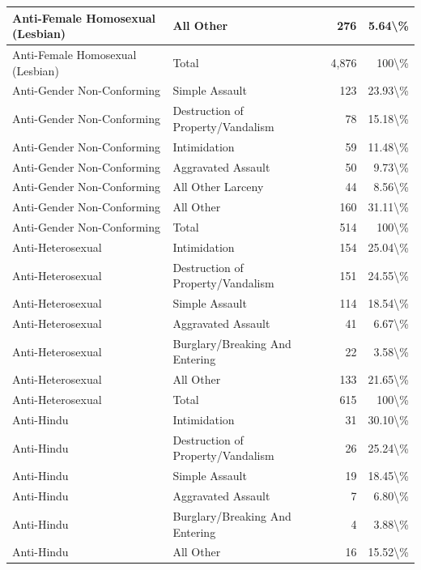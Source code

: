 \documentclass[
]{krantz}
\begin{document}
\begin{longtable}[t]{l|l|r|r}
\hline
Anti-Female Homosexual (Lesbian) & All Other & 276 & 5.64\textbackslash{}\%\\
\hline
Anti-Female Homosexual (Lesbian) & Total & 4,876 & 100\textbackslash{}\%\\
\hline
Anti-Gender Non-Conforming & Simple Assault & 123 & 23.93\textbackslash{}\%\\
\hline
Anti-Gender Non-Conforming & Destruction of Property/Vandalism & 78 & 15.18\textbackslash{}\%\\
\hline
Anti-Gender Non-Conforming & Intimidation & 59 & 11.48\textbackslash{}\%\\
\hline
Anti-Gender Non-Conforming & Aggravated Assault & 50 & 9.73\textbackslash{}\%\\
\hline
Anti-Gender Non-Conforming & All Other Larceny & 44 & 8.56\textbackslash{}\%\\
\hline
Anti-Gender Non-Conforming & All Other & 160 & 31.11\textbackslash{}\%\\
\hline
Anti-Gender Non-Conforming & Total & 514 & 100\textbackslash{}\%\\
\hline
Anti-Heterosexual & Intimidation & 154 & 25.04\textbackslash{}\%\\
\hline
Anti-Heterosexual & Destruction of Property/Vandalism & 151 & 24.55\textbackslash{}\%\\
\hline
Anti-Heterosexual & Simple Assault & 114 & 18.54\textbackslash{}\%\\
\hline
Anti-Heterosexual & Aggravated Assault & 41 & 6.67\textbackslash{}\%\\
\hline
Anti-Heterosexual & Burglary/Breaking And Entering & 22 & 3.58\textbackslash{}\%\\
\hline
Anti-Heterosexual & All Other & 133 & 21.65\textbackslash{}\%\\
\hline
Anti-Heterosexual & Total & 615 & 100\textbackslash{}\%\\
\hline
Anti-Hindu & Intimidation & 31 & 30.10\textbackslash{}\%\\
\hline
Anti-Hindu & Destruction of Property/Vandalism & 26 & 25.24\textbackslash{}\%\\
\hline
Anti-Hindu & Simple Assault & 19 & 18.45\textbackslash{}\%\\
\hline
Anti-Hindu & Aggravated Assault & 7 & 6.80\textbackslash{}\%\\
\hline
Anti-Hindu & Burglary/Breaking And Entering & 4 & 3.88\textbackslash{}\%\\
\hline
Anti-Hindu & All Other & 16 & 15.52\textbackslash{}\%\\

\end{longtable}
\end{document}
